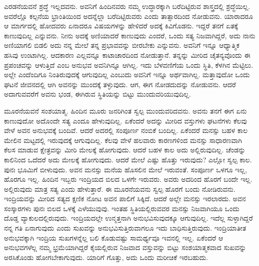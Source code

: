 ಎರಡನೆಯವನೆ ಶ್ರದ್ಧೆ ಇಲ್ಲದವನು. ಅವನಿಗೆ ಹಿಂದಿನವರು ನಮ್ಮ ಉದ್ಧಾರಕ್ಕಾಗಿ ಬರೆ\-ದಿಟ್ಟಿರುವ ಶಾಸ್ತ್ರದಲ್ಲಿ ಶ್ರದ್ಧೆಯಿಲ್ಲ. ಅವರೆಲ್ಲೊ ಕಲ್ಪನೆಯ ಭ್ರಾಂತಿಯಿಂದ ಅದನ್ನೆಲ್ಲಾ ಬರೆದಿಟ್ಟಿರುವರು ಎಂದು ತಾತ್ಸಾರದಿಂದ ನೋಡುವನು. ಯಾರಾದರೂ ಆ ಮಾರ್ಗದಲ್ಲಿ ಹೋದವರು ಏನಾದರೂ ವಿಷಯಗಳನ್ನು ಹೇಳಿದರೆ ಅದಕ್ಕೆ ಕಿವಿಗೊಡನು. ಇದ್ದರೆ ತನಗೆ ಏತಕ್ಕೆ ಕಾಣುವುದಿಲ್ಲ ಎನ್ನುವನು. ನೀನು ಅದಕ್ಕೆ ಅಣಿಯಾದರೆ ಕಾಣುವುದು ಎಂದರೆ, ಒಂದು ಸತ್ಯ ನಿಜವಾಗಿದ್ದರೆ, ಅದು ನಾನು ಅಣಿಯಾಗಲಿ ಬಿಡಲಿ ಅದು ನನ್ನ ಮೇಲೆ ತನ್ನ ಪ್ರಭಾವವನ್ನು ಬೀರಬೇಕು ಎನ್ನುವನು. ಅವನಿಗೆ ಇನ್ನೂ ಆಧ್ಯಾತ್ಮಿಕ ಹಸಿವು ಉಂಟಾಗಿಲ್ಲ. ಆದಕಾರಣ ಎಲ್ಲವನ್ನೂ ಕಾಟಾಚಾರದಿಂದ ನೋಡುತ್ತಾನೆ. ತನ್ನನ್ನು ಮೀರಿದ ಚೈತನ್ಯವೊಂದು ಈ ಪ್ರಪಂಚವನ್ನು ಆಳುತ್ತಿದೆ ಎಂಬ ಅನುಭವ ಅವನಿಗಿನ್ನೂ ಆಗಿಲ್ಲ. ಇದು ಬೆಳವಣಿಗೆಯ ಒಂದು ಸ್ಥಿತಿ, ಕೆಳಗಿನ ಮೆಟ್ಟಿಲು. ಅಲ್ಲೇ ಎಂದೆಂದಿಗೂ ನಿಂತಿರುವುದಕ್ಕೆ ಆಗುವುದಿಲ್ಲ ಎಂಬುದು ಅವನಿಗೆ ಇನ್ನೂ ಅರ್ಥವಾಗಿಲ್ಲ. ಮತ್ತಾವುದೋ ಒಂದು ಘಟನೆ ಜೀವನದಲ್ಲಿ ಆಗಿ ಅವನನ್ನು ಮುಂದಕ್ಕೆ ತಳ್ಳುವುದು. ಆಗ, ಈಗ ನೋಡದುದನ್ನು ನೋಡುವನು. ಆದರೆ ಅದಾಗುವವರೆಗೆ ಅವನು ಭಂಡ, ಈಗಿರುವ ಸ್ಥಿತಿಯನ್ನು ಬಿಟ್ಟು ಮುಂದುವರಿಯುವುದಿಲ್ಲ.

ಮೂರನೆಯವನೆ ಸಂಶಯಾತ್ಮ. ಹಿಂದಿನ ಮೂರು ಜನರಿಗಿಂತ ಸ್ವಲ್ಪ ಮುಂದುವರಿದವನು. ಅವನು ತನಗೆ ಈಗ ಏನು ಕಾಣುವುದೋ ಅದೊಂದೇ ಸತ್ಯ ಎಂದೂ ಹೇಳುವುದಿಲ್ಲ. ಏಕೆಂದರೆ ಅದನ್ನು ಮೀರಿದ ವಸ್ತುಗಳು ಘಟನೆಗಳು ಕೆಲವು ವೇಳೆ ಅವನ ಅನುಭವಕ್ಕೆ ಬಂದಿವೆ. ಆದರೆ ಅದರಲ್ಲಿ ಸಂಪೂರ್ಣ ನಂಬಿಕೆ ಬಂದಿಲ್ಲ. ಏಕೆಂದರೆ ಮನಸ್ಸು ಬಹಳ ಕಾಲ ಮೇಲಿನ ಮಟ್ಟದಲ್ಲಿ ಇರುವುದಕ್ಕೆ ಆಗುವುದಿಲ್ಲ. ಕೆಲವು ವೇಳೆ ಹಲವಾರು ಕಾರಣಗಳಿಂದ ಮನಸ್ಸು ಸಾಧಾರಣವಾಗಿ ಕೆಲಸ ಮಾಡುವ ಕ್ಷೇತ್ರವನ್ನು ಮೀರಿ ಮೇಲಕ್ಕೆ ಹೋಗುವುದು. ಆದರೆ ಬಹಳ ಕಾಲ ಅದು ಅಲ್ಲಿರುವುದಿಲ್ಲ. ಚೆಂಡನ್ನು ಕಾಲಿನಿಂದ ಒದೆದರೆ ಅದು ಮೇಲಕ್ಕೆ ಹೋಗುವುದು. ಆದರೆ ಮೇಲೆ ಎಷ್ಟು ಹೊತ್ತು ಇರುವುದು? ಎಲ್ಲೋ ಸ್ವಲ್ಪ ಕಾಲ. ಪುನಃ ಭೂಮಿಗೆ ಬೀಳುವುದು. ಅವನ ಮನಸ್ಸು ಮನೆಯ ಹೊಸಲಿನ ಮೇಲೆ ಇರುವಂತೆ. ಸಂಪೂರ್ಣ ಒಳಗೂ ಇಲ್ಲ, ಹೊರಗೂ ಇಲ್ಲ. ಹಿಂದಿನ ಇಬ್ಬರು ಇಂದ್ರಿಯದ ಬಿಲದ ಒಳಗೇ ಇರುವರು. ಅವರು ಅದರಿಂದ ಹೊರಗೆ ಬಂದೇ ಇಲ್ಲ. ಅಲ್ಲಿರುವುದು ಮಾತ್ರ ಸತ್ಯ ಎಂದು ಹೇಳುತ್ತಾರೆ. ಈ ಮೂರನೆಯವನು ಸ್ವಲ್ಪ ಹೊರಗೆ ಬಂದು ನೋಡಿರುವನು. ಇಂದ್ರಿಯವನ್ನು ಮೀರಿದ ಸತ್ಯದ ಕ್ಷಣಿಕ ನೋಟ ಅವನ ಪಾಲಿಗೆ ಸಿಕ್ಕಿದೆ. ಆದರೆ ಅಲ್ಲೇ ಮನಸ್ಸು ಇರಲಾರದು. ಅವನ ಸಂಸ್ಕಾರಗಳು ಪುನಃ ಬಿಲದ ಒಳಕ್ಕೆ ಎಳೆಯುವುವು. ಇಂತಹ ಸ್ಥಿತಿಯಲ್ಲಿರುವವರ ಮನಸ್ಸು ನಿಜವಾಗಿಯೂ ಒಂದು ದೊಡ್ಡ ವ್ಯಾಕುಲದಲ್ಲಿರುವುದು. ಇಂದ್ರಿಯದಲ್ಲೇ ಉನ್ಮತ್ತನಾಗಿ ಅನುಭವಿಸುವುದಕ್ಕೂ ಆಗುವುದಿಲ್ಲ. ಇದೆಲ್ಲ ಸುಳ್ಳಾಗಿದ್ದರೆ ನನ್ನ ಗತಿ ಏನಾಗುವುದು ಎಂದು ಸುಖವನ್ನು ಅನುಭವಿಸುತ್ತಿರುವಾಗಲೂ ಇದು ಬಾಧಿಸುತ್ತಿರುವುದು. ಇಂದ್ರಿಯಾತೀತ ಅನುಭವಕ್ಕಾಗಿ ಇಂದ್ರಿಯ ಸುಖಗಳನ್ನೆಲ್ಲ ಬಲಿ ಕೊಡುವಷ್ಟು ಸಾಮರ್ಥ್ಯವೂ ಇವನಲ್ಲಿ ಇಲ್ಲ. ಏಕೆಂದರೆ ಆ ಅನುಭವಗಳೆಲ್ಲ ನಮ್ಮ ಭ್ರಮೆಯಾಗಿದ್ದರೆ ಕೈಯಲ್ಲಿರುವ ನಿಜವಾದ ವಸ್ತುವನ್ನು ಬಿಟ್ಟು ಸಂಶಯಾತ್ಮಕವಾದ ಸುಖವನ್ನು ಅರಸಿಕೊಂಡು ಹೋಗಬೇಕಾಗುವುದು. ಯಾರಿಗೆ ಗೊತ್ತು, ಅದು ಒಂದು ಮರೀಚಿಕೆ ಇರಬಹುದು.

